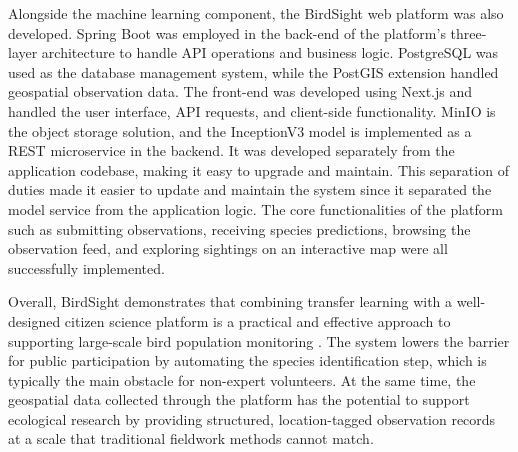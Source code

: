 Alongside the machine learning component, the BirdSight web platform was also developed.
Spring Boot was employed in the back-end of the platform’s three-layer architecture
to handle API operations and business logic. PostgreSQL was used as the database
management system, while the PostGIS extension handled geospatial observation data. 
The front-end was developed using Next.js and handled the user interface, API requests, 
and client-side functionality. MinIO is the object storage solution, and the InceptionV3 model is implemented as a REST microservice in the backend. It was developed separately from the application codebase, making it easy to upgrade and maintain. This separation of duties made it easier to update and maintain the system since it separated the model service from the application logic. 
The core functionalities of the platform such as submitting observations, receiving species
predictions, browsing the observation feed, and exploring sightings on an interactive
map were all successfully implemented.

Overall, BirdSight demonstrates that combining transfer learning with a well-designed
citizen science platform is a practical and effective approach to supporting large-scale
bird population monitoring \cite{lolge2025evolution}. The system lowers the barrier for public participation
by automating the species identification step, which is typically the main obstacle
for non-expert volunteers. At the same time, the geospatial data collected through
the platform has the potential to support ecological research by providing structured,
location-tagged observation records at a scale that traditional fieldwork methods
cannot match.

\clearpage